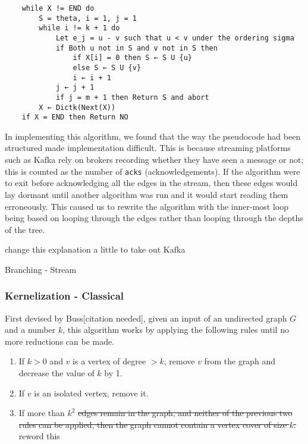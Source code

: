 \begin{verbatim}
    while X != END do
        S = theta, i = 1, j = 1
        while i != k + 1 do
            Let e_j = u - v such that u < v under the ordering sigma
            if Both u not in S and v not in S then
                if X[i] = 0 then S ← S U {u}
                else S ← S U {v}
                i ← i + 1
            j ← j + 1
            if j = m + 1 then Return S and abort
        X ← Dictk(Next(X))
    if X = END then Return NO
\end{verbatim}

In implementing this algorithm, we found that the way the pseudocode had
been structured made implementation difficult. This is because streaming
platforms such as Kafka rely on brokers recording whether they have seen
a message or not; this is counted as the number of \texttt{acks}
(acknowledgements). If the algorithm were to exit before acknowledging
all the edges in the stream, then these edges would lay dormant until
another algorithm was run and it would start reading them erroneously.
This caused us to rewrite the algorithm with the inner-most loop being
based on looping through the edges rather than looping through the
depths of the tree.

change this explanation a little to take out Kafka

\begin{algorithm}[H]
    \caption{Branching - Stream}
    \DontPrintSemicolon
\end{algorithm}

\subsubsection{Kernelization - Classical}

First devised by Buss{[}citation needed{]}, given an input of an
undirected graph \(G\) and a number \(k\), this algorithm works by
applying the following rules until no more reductions can be made.

\begin{enumerate}
    \item
          If \(k > 0\) and \(v\) is a vertex of degree \(> k\), remove \(v\)
          from the graph and decrease the value of \(k\) by 1.
    \item
          If \(v\) is an isolated vertex, remove it.
    \item
          If more than \(k^2\) \sout{edges remain in the graph, and neither of
              the previous two rules can be applied, then the graph cannot contain a
              vertex cover of size \(k\).} reword this
\end{enumerate}

